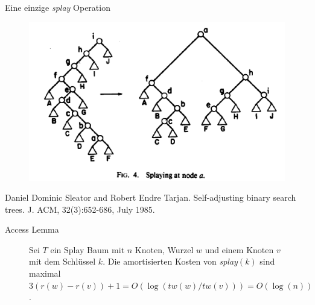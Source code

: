 \documentclass[11pt]{beamer}
\begin{document}
\begin{frame}{Eine einzige \textit{splay} Operation}
	\begin{figure}[H]
		\centering
		\includegraphics[width=1\textwidth]{"Medien/pres/splay"}
	
	\end{figure}
	{Daniel Dominic Sleator and Robert Endre Tarjan. Self-adjusting binary
	search trees. J. ACM, 32(3):652-686, July 1985.}
\end{frame}


\begin{frame}{Access Lemma}
	\begin{figure}[H]
		Sei $T$ ein Splay Baum mit $n$ Knoten, Wurzel $w$ und einem Knoten $v$ mit dem Schlüssel $k$. Die amortisierten Kosten von \textit{splay}$\left(k\right)$ sind maximal $3 \left(r\left(w\right) - r\left(v\right)\right) + 1 = O\left(\log\left(\mathit{tw}\left(w\right) / \mathit{tw}\left(v\right)\right) \right) = O\left(\log\left(n\right)\right)$. 
	\end{figure}
\end{frame}
\end{document}
